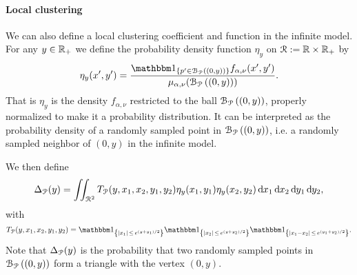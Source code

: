 \paragraph{Local clustering}
We can also define a local clustering coefficient and function in the infinite model. 
%
For any $y \in {\ensuremath{\mathbb R}}_+$ we define the probability density function $\eta_y$ on ${\mathcal R} :=  {\mathbb R} \times {\ensuremath{\mathbb R}}_+$ by  
\begin{equation}\label{eq:def_eta_P}
	\eta_y(x^\prime, y^\prime) = \frac{\ind{p^\prime \in \BallPo{(0,y)}} f_{\alpha,\nu}(x^\prime,y^\prime)}{\mu_{\alpha,\nu}(\BallPo{(0,y)})}.
\end{equation}
That is $\eta_y$ is the density $f_{\alpha,\nu}$ restricted to the ball ${\mathcal B}_{{\mathcal P}}\left((0,y)\right)$, properly normalized to make it a probability distribution. It can be interpreted as the probability density of a randomly sampled point in ${\mathcal B}_{{\mathcal P}}\left((0,y)\right)$, i.e. a randomly sampled neighbor of $(0,y)$ in the infinite model. 

We then define
\begin{equation}\label{eq:def_delta_p}
	\Delta_{{\mathcal P}}(y) = \iint_{{\mathcal R}^2} T_{{\mathcal P}}(y, x_1, x_2, y_1, y_2) \eta_{y}(x_1,y_1)\eta_{y}(x_2,y_2) \operatorname{\mathrm{d}\hspace{-2pt}} x_1 \operatorname{\mathrm{d}\hspace{-2pt}} x_2  \operatorname{\mathrm{d}\hspace{-2pt}} y_1  \operatorname{\mathrm{d}\hspace{-2pt}} y_2,
\end{equation}
with 
\[
	T_\Pcal(y, x_1, x_2, y_1, y_2) 
	= \ind{|x_1| \, \le \, e^{(y+y_1)/2}}\ind{|x_2| \, \le \, e^{(y+y_2)/2}}\ind{|x_1-x_2| \, \le \, e^{(y_1+y_2)/2}}.
\]
Note that $\Delta_{{\mathcal P}}(y)$ is the probability that two randomly sampled points in ${\mathcal B}_{{\mathcal P}}\left((0,y)\right)$ form a triangle with the vertex $(0,y)$.

%


